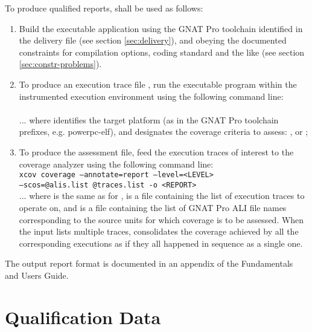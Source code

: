\documentclass {report}
\begin{document}
To produce qualified reports, \xcov{} shall be used as follows:

\begin{enumerate}
\item Build the executable application using the GNAT Pro toolchain
  identified in the delivery file (see section \ref{sec:delivery}), and
  obeying the documented constraints for compilation options, coding
  standard and the like (see section \ref{sec:constr-problems}).

\item To produce an execution trace file , run the 
  executable program within the instrumented execution environment using the
  following command line:\\

 \\

... where  identifies the target platform (as in the GNAT Pro
toolchain prefixes, e.g.  powerpc-elf), and  designates the
coverage criteria to assess: ,  or ;

\item To produce the assessment  file, feed the execution traces
  of interest to the coverage analyzer using the following command line:\\

\texttt{xcov coverage --annotate=report --level=<LEVEL> \\
  --scos=@alis.list @traces.list -o <REPORT>} \\

... where  is the same as for ,  is a
file containing the list of execution traces to operate on, and 
is a file containing the list of GNAT Pro ALI file names corresponding to the
source units for which coverage is to be assessed.
%
When the  input lists multiple traces, \xcov{} consolidates the
coverage achieved by all the corresponding executions as if they all happened
in sequence as a single one.

\end{enumerate}

The output report format is documented in an appendix of the \xcov{}
Fundamentals and Users Guide.

\chapter{Qualification Data}
\end{document}

